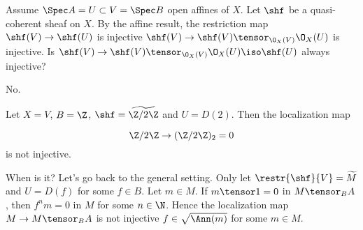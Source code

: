 \begin{question}
Assume $\Spec A = U \subset V = \Spec B$ open affines of $X$.
Let $\shf$ be a quasi-coherent sheaf on $X$.
By the affine result, the restriction map $\shf(V) \rightarrow \shf(U)$ is injective \iff $\shf(V) \rightarrow \shf(V)\tensor_{\O_X(V)}\O_X(U)$ is injective.
Is $\shf(V) \rightarrow \shf(V)\tensor_{\O_X(V)} \O_X(U) \iso \shf(U)$ always injective?
\end{question}
\begin{Qanswer}
No.

Let $X=V$, $B= \Z$, $\shf= \widetilde{\Z/2\Z}$ and $U= D(2)$.
Then the localization map 

\[ \Z/2\Z \rightarrow (\Z/2\Z)_2 = 0\]
is not injective. 

\bigskip
When is it?
Let's go back to the general setting. 
Only let $\restr{\shf}{V}= \widetilde{M}$ and $U= D(f)$ for some $f \in B$.
Let $m\in M$. If $m \tensor 1 = 0$ in $M\tensor_B A$, then $f^n m = 0$ in $M$ for some $n\in \N$.
Hence the localization map $M\rightarrow M\tensor_B A$ is not injective \iff $f\in \sqrt{\Ann(m)}$ for some $m\in M$.
\end{Qanswer}
